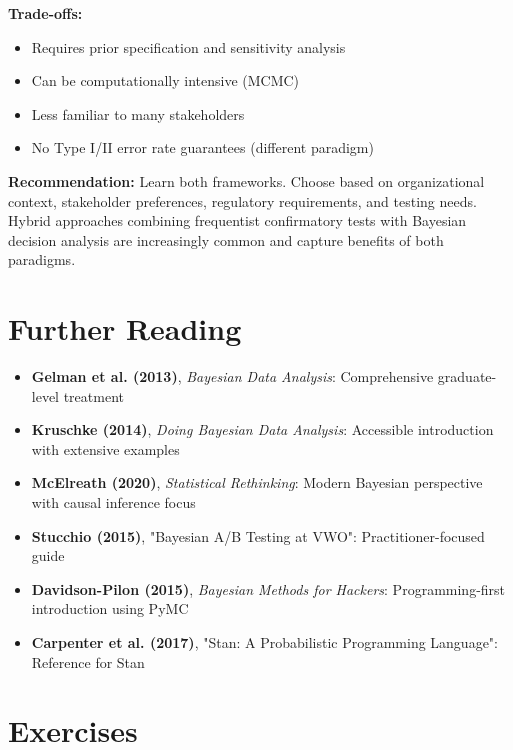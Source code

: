\textbf{Trade-offs:}
\begin{itemize}
    \item Requires prior specification and sensitivity analysis
    \item Can be computationally intensive (MCMC)
    \item Less familiar to many stakeholders
    \item No Type I/II error rate guarantees (different paradigm)
\end{itemize}

\textbf{Recommendation:} Learn both frameworks. Choose based on organizational context, stakeholder preferences, regulatory requirements, and testing needs. Hybrid approaches combining frequentist confirmatory tests with Bayesian decision analysis are increasingly common and capture benefits of both paradigms.

\section{Further Reading}

\begin{itemize}
    \item \textbf{Gelman et al. (2013)}, \textit{Bayesian Data Analysis}: Comprehensive graduate-level treatment
    \item \textbf{Kruschke (2014)}, \textit{Doing Bayesian Data Analysis}: Accessible introduction with extensive examples
    \item \textbf{McElreath (2020)}, \textit{Statistical Rethinking}: Modern Bayesian perspective with causal inference focus
    \item \textbf{Stucchio (2015)}, "Bayesian A/B Testing at VWO": Practitioner-focused guide
    \item \textbf{Davidson-Pilon (2015)}, \textit{Bayesian Methods for Hackers}: Programming-first introduction using PyMC
    \item \textbf{Carpenter et al. (2017)}, "Stan: A Probabilistic Programming Language": Reference for Stan
\end{itemize}

\section{Exercises}


